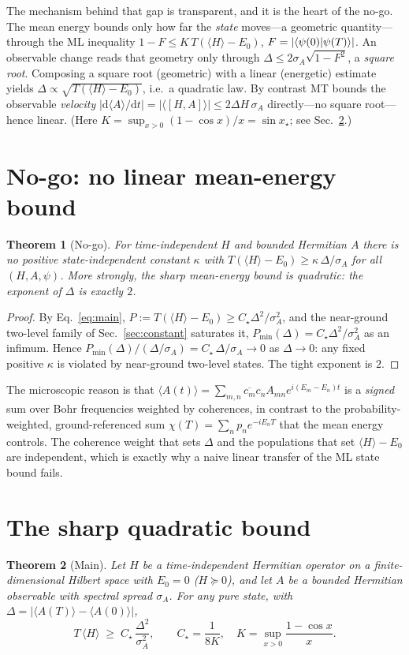 \documentclass[aps,pra,twocolumn,superscriptaddress,nofootinbib,longbibliography]{revtex4-2}
\newtheorem{theorem}{Theorem}
\newcommand{\Ctrue}{C_{\star}}
\newcommand{\xstar}{x_{\star}}
\newcommand{\mean}[1]{\langle #1 \rangle}
\begin{document}
\noindent The mechanism behind that gap is transparent, and it is the heart of the no-go. The mean energy
bounds only how far the \emph{state} moves---a geometric quantity---through the ML inequality
$1-F\le K\,T(\mean{H}-E_0)$, $F=|\!\braket{\psi(0)|\psi(T)}\!|$. An observable change reads that geometry only
through $\Delta\le 2\sigma_A\sqrt{1-F^2}$, a \emph{square root}. Composing a square root (geometric) with a
linear (energetic) estimate yields $\Delta\propto\sqrt{T(\mean{H}-E_0)}$, i.e.\ a quadratic law. By contrast
MT bounds the observable \emph{velocity} $|\mathrm d\mean A/\mathrm dt|=|\mean{[H,A]}|\le 2\Delta H\,\sigma_A$
directly---no square root---hence linear. (Here $K=\sup_{x>0}(1-\cos x)/x=\sin\xstar$; see
Sec.~\ref{sec:main}.)

\section{No-go: no linear mean-energy bound}
\label{sec:nogo}
\begin{theorem}[No-go]
For time-independent $H$ and bounded Hermitian $A$ there is no positive state-independent constant $\kappa$
with $T(\mean{H}-E_0)\ge \kappa\,\Delta/\sigma_A$ for all $(H,A,\psi)$. More strongly, the sharp
mean-energy bound is quadratic: the exponent of $\Delta$ is exactly $2$.
\end{theorem}
\begin{proof}
By Eq.~\eqref{eq:main}, $P:=T(\mean{H}-E_0)\ge \Ctrue\Delta^2/\sigma_A^2$, and the near-ground two-level
family of Sec.~\ref{sec:constant} saturates it, $P_{\min}(\Delta)=\Ctrue\Delta^2/\sigma_A^2$ as an infimum.
Hence $P_{\min}(\Delta)/(\Delta/\sigma_A)=\Ctrue\,\Delta/\sigma_A\to0$ as $\Delta\to0$: any fixed positive
$\kappa$ is violated by near-ground two-level states. The tight exponent is $2$.
\end{proof}

\noindent The microscopic reason is that $\mean{A(t)}=\sum_{m,n}\overline{c_m}c_n A_{mn}e^{i(E_m-E_n)t}$ is a
\emph{signed} sum over Bohr frequencies weighted by coherences, in contrast to the probability-weighted,
ground-referenced sum $\chi(T)=\sum_n p_n e^{-iE_nT}$ that the mean energy controls. The coherence weight that
sets $\Delta$ and the populations that set $\mean H-E_0$ are independent, which is exactly why a naive linear
transfer of the ML state bound fails.

\section{The sharp quadratic bound}
\label{sec:main}
\begin{theorem}[Main]
Let $H$ be a time-independent Hermitian operator on a finite-dimensional Hilbert space with $E_0=0$
($H\succeq0$), and let $A$ be a bounded Hermitian observable with spectral spread $\sigma_A$. For any pure
state, with $\Delta=|\mean{A(T)}-\mean{A(0)}|$,
\begin{equation}
T\,\mean{H}\;\ge\;\Ctrue\,\frac{\Delta^2}{\sigma_A^2},\qquad \Ctrue=\frac{1}{8K},\quad K=\sup_{x>0}\frac{1-\cos x}{x}.
\end{equation}
\end{theorem}
\end{document}
